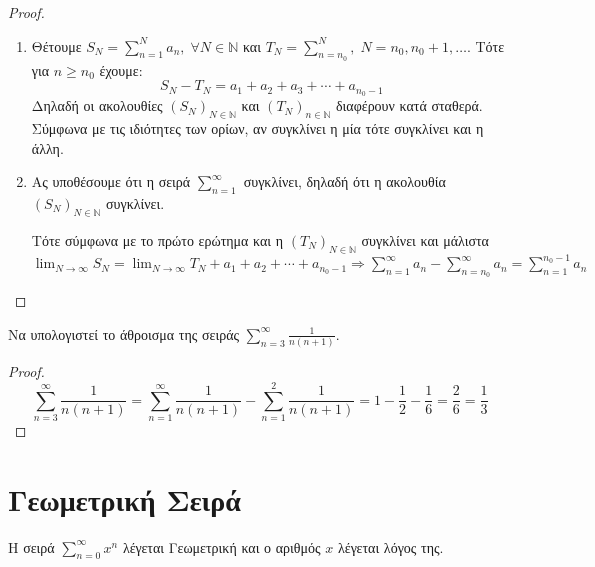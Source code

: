 \documentclass[main.tex]{subfiles}
\begin{document}
\begin{proof}
\item {}
    \begin{enumerate}
        \item Θέτουμε $ S_{N} = \sum_{n=1}^{N} a_{n}, \; 
            \forall N \in \mathbb{N} $ και $ T_{N} = \sum_{n= n_{0}}^{N}, \; N= n_{0}, 
            n_{0}+1, \ldots $. Τότε για $ n \geq n_{0} $ έχουμε:
            \[
                S_{N}-T_{N} = a_{1}+ a_{2}+ a_{3}+ \cdots + a_{n_0-1} 
            \] 
            Δηλαδή οι ακολουθίες $ (S_{N})_{N \in \mathbb{N}} $ και 
            $ (T_{N})_{n \in \mathbb{N}} $ διαφέρουν κατά σταθερά. Σύμφωνα 
            με τις ιδιότητες των ορίων, αν συγκλίνει η μία τότε συγκλίνει και η άλλη.

        \item Ας υποθέσουμε ότι η σειρά $ \sum_{n=1}^{\infty} $ συγκλίνει, 
            δηλαδή ότι η ακολουθία $ (S_{N})_{N \in \mathbb{N}} $ συγκλίνει. 

            Τότε σύμφωνα με το πρώτο ερώτημα και η $ (T_{N})_{N \in \mathbb{N}} $
            συγκλίνει και μάλιστα $ \lim_{N \to \infty} S_{N} = \lim_{N \to \infty} 
            T_{N} + a_{1}+ a_{2} + \cdots + a_{n_{0}-1} 
            \Rightarrow \sum_{n=1}^{\infty} a_{n}- \sum_{n= n_{0}}^{\infty} a_{n} = 
            \sum_{n=1}^{n_{0}-1} a_{n}    $
    \end{enumerate}
\end{proof}

\begin{example}
    Να υπολογιστεί το άθροισμα της σειράς $ \sum_{n=3}^{\infty} \frac{1}{n(n+1)} $.
\end{example}
\begin{proof}
    \[
        \sum_{n=3}^{\infty} \frac{1}{n(n+1)} = \sum_{n=1}^{\infty} 
        \frac{1}{n(n+1)} - \sum_{n=1}^{2} \frac{1}{n(n+1)} = 1 - \frac{1}{2} - 
        \frac{1}{6} = \frac{2}{6} = \frac{1}{3}
    \] 
\end{proof}


\section{Γεωμετρική Σειρά}

Η σειρά $ \sum_{n=0}^{\infty} x^{n} $ λέγεται Γεωμετρική και ο αριθμός $x$ λέγεται 
λόγος της.

\end{document}
